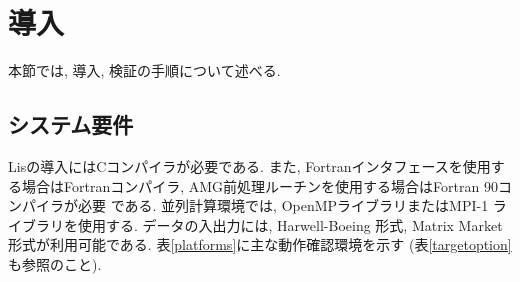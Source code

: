 \documentclass[a4paper]{jarticle}
\begin{document}
\newpage
\section{導入}
本節では, 導入, 検証の手順について述べる. 

\subsection{システム要件}
Lisの導入にはCコンパイラが必要である. 
また, Fortranインタフェースを使用する場合はFortranコンパイラ, 
AMG前処理ルーチンを使用する場合はFortran 90コンパイラが必要
である. 並列計算環境では, OpenMPライブラリ\cite{OpenMP}またはMPI-1
ライブラリ\cite{MPI}を使用する\cite{kota1,kota2}. 
データの入出力には, Harwell-Boeing 
形式\cite{duff92}, Matrix Market形式\cite{matrixmarket}が利用可能である. 
表\ref{platforms}に主な動作確認環境を示す
 (表\ref{targetoption}も参照のこと). 
\end{document}
